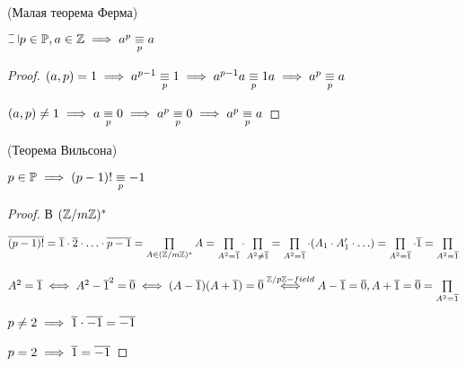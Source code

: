 \begin{theorem}(Малая теорема Ферма)

    $\letus p \in \P, a \in \Z \implies a^p \equivm{p} a$
\end{theorem}

\begin{proof}

    $(a, p) = 1 \implies a^{p-1} \underset{p}{\equiv} 1 \implies a^{p-1}a \underset{p}{\equiv} 1a \implies a^p \underset{p}{\equiv} a$

    $(a, p) \neq 1 \implies a \underset{p}{\equiv} 0 \implies a^p \underset{p}{\equiv} 0 \implies a^p \underset{p}{\equiv} a$
\end{proof}

\begin{theorem}(Теорема Вильсона)

    $p \in \mathbb{P} \implies (p-1)! \underset{p}{\equiv} -1$
\end{theorem}

\begin{proof}
    
    В $(\mathbb{Z}/m\mathbb{Z})^*$ 

    $\overline{(p-1)!} = \overline{1} \cdot \overline{2} \cdot \ldots \cdot \overline{p-1} = \prod\limits_{A \in (\mathbb{Z}/m\mathbb{Z})^*} A = 
    \prod\limits_{A^2 = \overline{1}} \cdot \prod\limits_{A^2 \neq \overline{1}} = \prod\limits_{A^2 = \overline{1}} \cdot (A_1 \cdot A_1' \cdot \ldots) = \prod\limits_{A^2 = \overline{1}} \cdot \overline{1} = \prod\limits_{A^2 = \overline{1}}$
    
    $A^2 = \overline{1} \iff A^2 - \overline{1}^2 = \overline{0} \iff (A - \overline{1})(A + \overline{1}) = \overline{0} \overset{\mathbb{Z}/p\mathbb{Z} - field}{\iff} A - \overline{1} = \overline{0}, A + \overline{1} = \overline{0} = \prod\limits_{A^2 = \overline{1}}$
    
    $p \neq 2 \implies \overline{1} \cdot \overline{-1} = \overline{-1}$
    
    $p = 2 \implies \overline{1} = \overline{-1}$
\end{proof}


